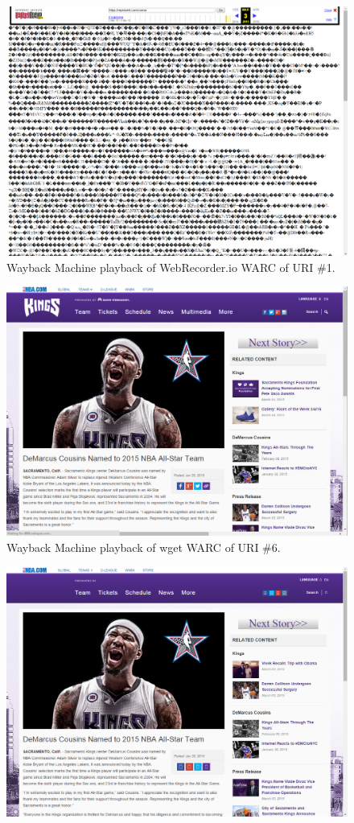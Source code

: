 \documentclass[a4paper,12pt]{article}
\begin{document}
\begin{appendices}
\begin{figure}[H]
    \includegraphics[scale=0.5]{images/1_webrecorder_in_wayback.png}
    \caption{Wayback Machine playback of WebRecorder.io WARC of URI \#1.}
\end{figure}
\begin{figure}[H]
    \centering
    \includegraphics[scale=0.5]{images/6_wget_in_wayback.png}
    \caption{Wayback Machine playback of wget WARC of URI \#6.}
\end{figure}
\begin{figure}[H]
    \centering
    \includegraphics[scale=0.5]{images/6_warcreate_in_wayback.png}

\end{figure}
\end{appendices}
\end{document}
